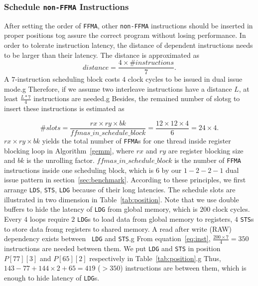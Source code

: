 \subsubsection{Schedule {\tt non-FFMA} Instructions}

After setting the order of {\tt FFMA}, other {\tt non-FFMA} instructions should be inserted in proper positions tog
assure the correct program without losing performance. In order to tolerate instruction latency, the
distance of dependent instructions needs to be larger than their latency. The distance is approximated as
\begin{equation}
\label{eq:inst}
distance = \frac{4\times\#instructions}{7}.
\end{equation}
A $7$-instruction scheduling block costs $4$ clock cycles to be issued in dual issue mode.g
Therefore, if we assume two interleave instructions have a distance $L$, at least $\frac{L*7}{4}$ instructions are needed.g
Besides, the remained number of slotsg
to insert these instructions is estimated as

\begin{displaymath}
\#slots = \frac{rx\times ry\times bk}{ffmas\_in\_schedule\_block}=\frac{12\times 12\times 4}{6}=24\times 4.
\end{displaymath}
$rx\times ry\times bk$ yields the total number of {\tt FFMA}s for one thread inside register blocking loop in Algorithm~\ref{gemm}, where $rx$ and $ry$ are register blocking size and $bk$ is the unrolling factor.
$ffmas\_in\_schedule\_block$ is the number of {\tt FFMA} instructions inside one scheduling block, which is $6$ by our $1-2-2-1$ dual issue pattern in section~\ref{sec:benchmark}.
According to these principles, we first arrange {\tt LDS}, {\tt STS}, {\tt LDG} because of their long latencies. The
schedule slots are illustrated in two dimension in Table~\ref{tab:position}.
Note that we use double buffers to hide the latency of {\tt LDG} from global memory, which is $200$ clock cycles.
Every $4$ loops require $2$ {\tt LDG}s to load data from global memory to registers, $4$ {\tt STS}s to store data fromg
registers to shared memory. A read after write (RAW) dependency exists between {\tt
LDG} and {\tt STS}.g
From equation~\ref{eq:inst}, $\frac{200\times 7}{4} = 350$ instructions are needed between them.
We put {\tt LDG} and  {\tt STS} in position $P[77][3]$ and $P[65][2]$ respectively in Table~\ref{tab:position}.g
Thus, $143-77 + 144\times 2 + 65=419$ ($>350$) instructions are between them, which is enough to hide latency of {\tt LDG}s.


